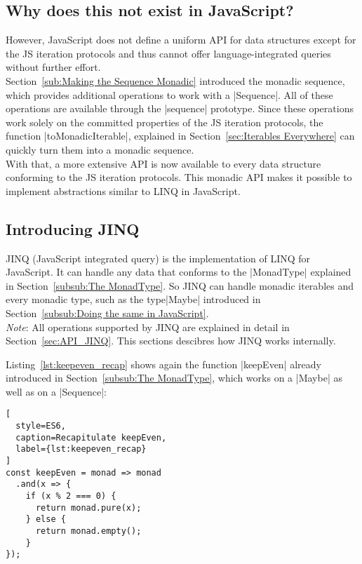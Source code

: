 \subsection{Why does this not exist in JavaScript?} %
\label{sub:Why does this not exist in JavaScript?}
However, JavaScript does not define a uniform API for data structures except
for the JS iteration protocols and thus cannot offer language-integrated queries
without further effort. \\
Section~\ref{sub:Making the Sequence Monadic} introduced the monadic sequence,
which provides additional operations to work with a |Sequence|. All of these
operations are available through the |sequence| prototype. Since these
operations work solely on the committed properties of the JS iteration
protocols, the function |toMonadicIterable|, explained in
Section~\ref{sec:Iterables Everywhere} can quickly turn them into a monadic
sequence.\\
With that, a more extensive API is now available to every data structure
conforming to the JS iteration protocols. This monadic API makes it possible to
implement abstractions similar to LINQ in JavaScript.

\subsection{Introducing JINQ} %
\label{sub:Introducing JINQ}
JINQ (JavaScript integrated query) is the implementation of LINQ for
JavaScript. It can handle any data that conforms to the |MonadType| explained
in Section~\ref{subsub:The MonadType}. So JINQ can handle monadic iterables and
every monadic type, such as the type|Maybe| introduced in
Section~\ref{subsub:Doing the same in JavaScript}.\\
\textit{Note}: All operations supported by JINQ are explained in detail in 
Section~\ref{sec:API_JINQ}. This sections descibres how JINQ works
internally.

Listing~\ref{lst:keepeven_recap} shows again the function |keepEven| already
introduced in Section~\ref{subsub:The MonadType}, which works on a |Maybe| as
well as on a |Sequence|:
\begin{lstlisting}[
  style=ES6,
  caption=Recapitulate keepEven,
  label={lst:keepeven_recap}
]
const keepEven = monad => monad
  .and(x => {
    if (x % 2 === 0) {
      return monad.pure(x);
    } else {
      return monad.empty();
    }
}); 
\end{lstlisting}


